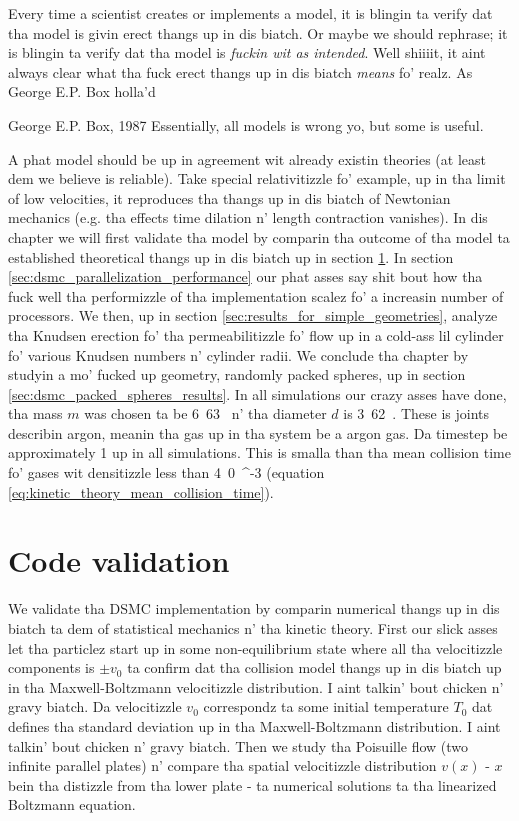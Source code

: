 Every time a scientist creates or implements a model, it is blingin ta verify dat tha model is givin erect thangs up in dis biatch. Or maybe we should rephrase; it is blingin ta verify dat tha model is \textit{fuckin wit as intended}. Well shiiiit, it aint always clear what tha fuck erect thangs up in dis biatch \textit{means} fo' realz. As George E.P. Box holla'd
\begin{aquote}{George E.P. Box, 1987}
Essentially, all models is wrong yo, but some is useful.
\end{aquote}
A phat model should be up in agreement wit already existin theories (at least dem we believe is reliable). Take special relativitizzle fo' example, up in tha limit of low velocities, it reproduces tha thangs up in dis biatch of Newtonian mechanics (e.g. tha effects time dilation n' length contraction vanishes). In dis chapter we will first validate tha model by comparin tha outcome of tha model ta established theoretical thangs up in dis biatch up in section \ref{sec:dsmc_code_validation}. In section \ref{sec:dsmc_parallelization_performance} our phat asses say shit bout how tha fuck well tha performizzle of tha implementation scalez fo' a increasin number of processors. We then, up in section \ref{sec:results_for_simple_geometries}, analyze tha Knudsen erection fo' tha permeabilitizzle fo' flow up in a cold-ass lil cylinder fo' various Knudsen numbers n' cylinder radii. We conclude tha chapter by studyin a mo' fucked up geometry, randomly packed spheres, up in section \ref{sec:dsmc_packed_spheres_results}. In all simulations our crazy asses have done, tha mass $m$ was chosen ta be \unit{6.63}{\kilo\gram} n' tha diameter $d$ is \unit{3.62}{\meter}. These is joints describin argon, meanin tha gas up in tha system be a argon gas. Da timestep be approximately \unit{1}{\pico\second} up in all simulations. This is smalla than tha mean collision time fo' gases wit densitizzle less than \unit{4.0}{\meter^{-3}} (equation \eqref{eq:kinetic_theory_mean_collision_time}).

\section{Code validation}
\label{sec:dsmc_code_validation}
We validate tha DSMC implementation by comparin numerical thangs up in dis biatch ta dem of statistical mechanics n' tha kinetic theory. First our slick asses let tha particlez start up in some non-equilibrium state where all tha velocitizzle components is $\pm v_0$ ta confirm dat tha collision model thangs up in dis biatch up in tha Maxwell-Boltzmann velocitizzle distribution. I aint talkin' bout chicken n' gravy biatch. Da velocitizzle $v_0$ correspondz ta some initial temperature $T_0$ dat defines tha standard deviation up in tha Maxwell-Boltzmann distribution. I aint talkin' bout chicken n' gravy biatch. Then we study tha Poisuille flow (two infinite parallel plates) n' compare tha spatial velocitizzle distribution $v(x)$ - $x$ bein tha distizzle from tha lower plate - ta numerical solutions ta tha linearized Boltzmann equation.
